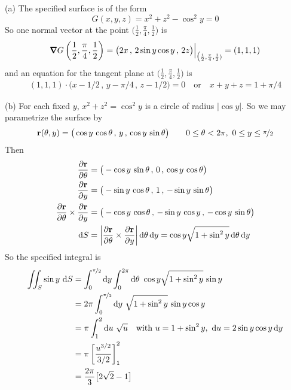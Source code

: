 \begin{solution} (a)
The specified surface is of the form
\begin{equation*}
G(x,y,z) = x^2 + z^2 - \cos^2 y = 0
\end{equation*}
So one normal vector at the point 
       $\big(\frac{1}{2} , \frac{\pi}{4} , \frac{1}{2} \big)$
is
\begin{equation*}
\vnabla G\left(\frac{1}{2} , \frac{\pi}{4} , \frac{1}{2} \right)
=\big(2x \,,\, 2\sin y\cos y \,,\, 2z \big)\Big|_{
             \big(\frac{1}{2} , \frac{\pi}{4} , \frac{1}{2} )}
=(1,1,1)
\end{equation*}
and an equation for the tangent plane at 
   $\big(\frac{1}{2} , \frac{\pi}{4} , \frac{1}{2} \big)$
is
\begin{align*}
(1,1,1)\cdot\big(x-1/2\,,\,y-\pi/4\,,\, z-1/2\big) =0\quad\text{or}\quad
x+y+z = 1+\pi/4
\end{align*}

\noindent (b) For each fixed $y$, $x^2+z^2=\cos^2y$ is a circle of
radius $|\cos y|$. So we may parametrize the surface by
\begin{align*}
\mathbf{r}(\theta,y)
=\big(\cos y\,\cos\theta\,,\, y \,,\, \cos y\,\sin\theta\big)\qquad
0\le\theta<2\pi,\ 0\le y\le \nicefrac{\pi}{2}
\end{align*}
Then
\begin{align*}
\frac{\partial \mathbf{r}}{\partial\theta}
 &= \big(-\cos y\,\sin\theta\,,\, 0 \,,\, \cos y\,\cos\theta\big) \\
\frac{\partial \mathbf{r}}{\partial y}
 &= \big(-\sin y\,\cos\theta\,,\, 1 \,,\, -\sin y\,\sin\theta\big) \\
\frac{\partial \mathbf{r}}{\partial\theta} \times
     \frac{\partial \mathbf{r}}{\partial y}
&=\big(-\cos y\,\cos\theta\,,\, -\sin y\,\cos y\,,\,-\cos y\,\sin\theta \big) \\
\mathrm{d}S
&= \left|\frac{\partial \mathbf{r}}{\partial\theta} \times
     \frac{\partial \mathbf{r}}{\partial y}\right|\mathrm{d}\theta\,\mathrm{d}y
=\cos y\sqrt{1+\sin^2 y}\,\mathrm{d}\theta\,\mathrm{d}y
\end{align*}
So the specified integral is
\begin{align*}
\dblInt_S \sin y\ \dee{S}
&= \int_0^{\nicefrac{\pi}{2}}\dee{y} \int_0^{2\pi}\dee{\theta}\ 
                \cos y\sqrt{1+\sin^2 y}\,\sin y \\
&= 2\pi \int_0^{\nicefrac{\pi}{2}}\dee{y}\ 
                \sqrt{1+\sin^2 y}\,\sin y\cos y \\
&= \pi \int_1^2 \dee{u}\ \sqrt{u}
           \quad\text{with }u=1+\sin^2 y,\ \dee{u}=2\sin y\cos y\,\dee{y} \\
&=\pi\left[\frac{u^{3/2}}{3/2}\right]_1^2 \\
&= \frac{2\pi}{3}\big[2\sqrt{2}-1\big]
\end{align*}

\end{solution}



